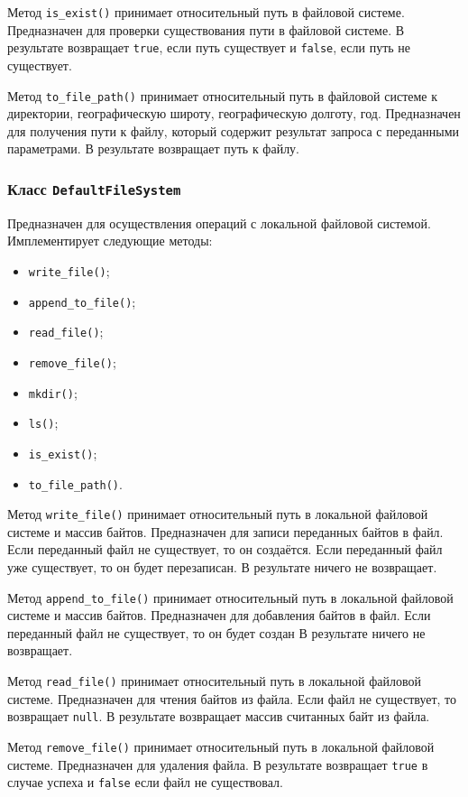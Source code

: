 Метод \texttt{is\_exist()} принимает относительный путь в файловой системе.
Предназначен для проверки существования пути в файловой системе.
В результате возвращает \texttt{true}, если путь существует и \texttt{false}, если путь не существует.

Метод \texttt{to\_file\_path()} принимает относительный путь в файловой системе к директории, географическую широту, географическую долготу, год.
Предназначен для получения пути к файлу, который содержит результат запроса с переданными параметрами.
В результате возвращает путь к файлу.


\subsubsection{Класс \texttt{DefaultFileSystem}}
Предназначен для осуществления операций с локальной файловой системой.
Имплементирует следующие методы:
\begin{itemize}
    \item \texttt{write\_file()};
    \item \texttt{append\_to\_file()};
    \item \texttt{read\_file()};
    \item \texttt{remove\_file()};
    \item \texttt{mkdir()};
    \item \texttt{ls()};
    \item \texttt{is\_exist()};
    \item \texttt{to\_file\_path()}.
\end{itemize}

Метод \texttt{write\_file()} принимает относительный путь в локальной файловой системе и массив байтов.
Предназначен для записи переданных байтов в файл.
Если переданный файл не существует, то он создаётся.
Если переданный файл уже существует, то он будет перезаписан.
В результате ничего не возвращает.

Метод \texttt{append\_to\_file()} принимает относительный путь в локальной файловой системе и массив байтов.
Предназначен для добавления байтов в файл.
Если переданный файл не существует, то он будет создан
В результате ничего не возвращает.

Метод \texttt{read\_file()} принимает относительный путь в локальной файловой системе.
Предназначен для чтения байтов из файла.
Если файл не существует, то возвращает \texttt{null}.
В результате возвращает массив считанных байт из файла.

Метод \texttt{remove\_file()} принимает относительный путь в локальной файловой системе.
Предназначен для удаления файла.
В результате возвращает \texttt{true} в случае успеха и \texttt{false} если файл не существовал.

